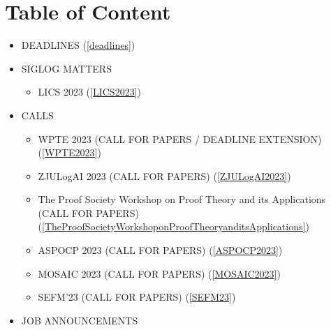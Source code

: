 \documentclass[prodmode,acmtecs]{acmsmall} %
\begin{document}
\section{Table of Content}\begin{itemize}\item DEADLINES (\cref{deadlines}) 
 
\item SIGLOG MATTERS 
 
\begin{itemize}\item LICS 2023 (\cref{LICS2023})
\end{itemize} 
\item CALLS 
 
\begin{itemize}\item WPTE 2023 (CALL FOR PAPERS / DEADLINE EXTENSION) (\cref{WPTE2023})
\item ZJULogAI 2023 (CALL FOR PAPERS) (\cref{ZJULogAI2023})
\item The Proof Society Workshop on Proof Theory and its Applications (CALL FOR PAPERS) (\cref{TheProofSocietyWorkshoponProofTheoryanditsApplications})
\item ASPOCP 2023 (CALL FOR PAPERS) (\cref{ASPOCP2023})
\item MOSAIC 2023 (CALL FOR PAPERS) (\cref{MOSAIC2023})
\item SEFM'23 (CALL FOR PAPERS) (\cref{SEFM23})
\end{itemize} 
\item JOB ANNOUNCEMENTS 
 

\end{itemize}
\end{document}
